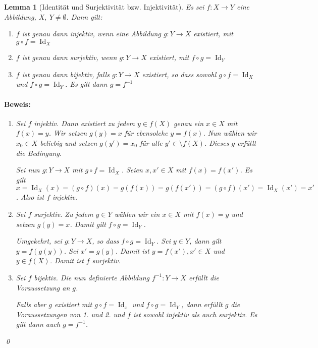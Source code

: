 \documentclass{report}
\DeclareMathOperator{\Id}{Id}
\theoremstyle{customrem}
\theoremstyle{customdef}
\newtheorem{lemma}[definition]{Lemma}
\renewenvironment{proof}{\paragraph{Beweis: }}{\qed}
\theoremstyle{customenv}
\begin{document}
	\begin{lemma}[Identität und Surjektivität bzw. Injektivität]
		Es sei \(f : X \to Y\) eine Abbildung, \(X,\ Y \neq \emptyset\). Dann gilt:
		\begin{enumerate}
			\itemsep0cm
			\item \(f\) ist genau dann injektiv, wenn eine Abbildung \(g : Y \to X\) existiert, mit \(g \circ f = \Id_X\)
			\item \(f\) ist genau dann surjektiv, wenn \(g : Y \to X\) existiert, mit \(f \circ g = \Id_Y\)
			\item \(f\) ist genau dann bijektiv, falls \(g : Y \to X\) existiert, so dass sowohl \(g \circ f = \Id_X\) und \(f \circ g = \Id_Y\). Es gilt dann \(g = f^{-1}\)
		\end{enumerate}
		\begin{proof}
			\begin{enumerate}
				\item Sei \(f\) injektiv. Dann existiert zu jedem \(y \in f(X)\) genau ein \(x \in X\) mit \(f(x) = y\). Wir setzen \(g(y) = x\) für ebensolche \(y = f(x)\). Nun wählen wir \(x_0\in X\) beliebig und setzen \(g(y') = x_0\) für alle \(y' \in \setminus f(X)\). Dieses \(g\) erfüllt die Bedingung.
				
				Sei nun \(g : Y \to X\) mit \(g \circ f = \Id_X\). Seien \(x, x' \in X\) mit \(f(x) = f(x')\). Es gilt \(x = \Id_X(x) = (g \circ f)(x) = g(f(x)) = g(f(x')) = (g \circ f)(x') = \Id_X(x') = x'\). Also ist \(f\) injektiv.
				\item Sei \(f\) surjektiv. Zu jedem \(y \in Y\) wählen wir ein \(x \in X\) mit \(f(x) = y\) und setzen \(g(y) = x\). Damit gilt \(f \circ g = \Id_Y\).
				
				Umgekehrt, sei \(g : Y \to X\), so dass \(f \circ g = \Id_Y\). Sei \(y \in Y\), dann gilt \(y = f(g(y))\). Sei \(x' = g(y)\). Damit ist \(y = f(x'), x' \in X\) und \(y \in f(X)\). Damit ist \(f\) surjektiv.
				\item Sei \(f\) bijektiv. Die nun definierte Abbildung \(f^{-1} : Y \to X\) erfüllt die Voraussetzung an \(g\).
				
				Falls aber \(g\) existiert mit \(g \circ f = \Id_x\) und \(f \circ g = \Id_Y\), dann erfüllt \(g\) die Voraussetzungen von 1. und 2. und \(f\) ist sowohl injektiv als auch surjektiv. Es gilt dann auch \(g = f^{-1}\).
			\end{enumerate}
		\end{proof}
	\end{lemma}
	
\end{document}
